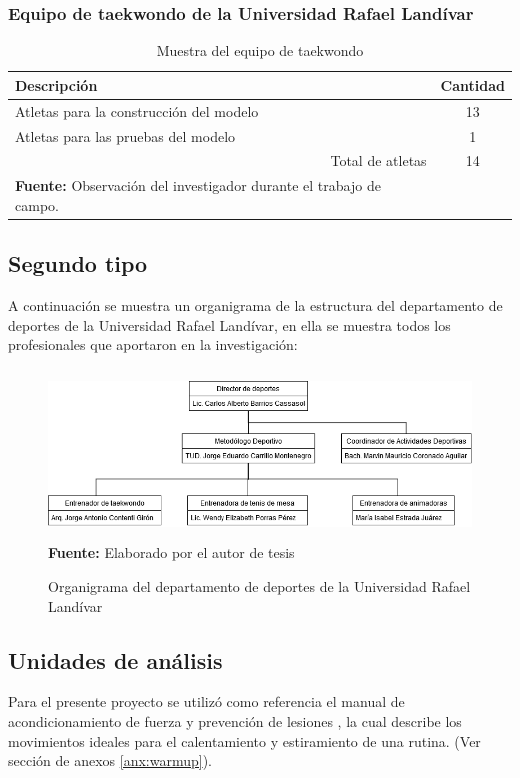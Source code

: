 \subsubsection{Equipo de taekwondo de la Universidad Rafael Land\'ivar}\label{sj:1t:tae}
\begin{table}[H]
\begin{center}
\caption{Muestra del equipo de taekwondo}
\label{tab:MuestraTaekwondo}
\begin{tabular}{lc}
\hline
\multicolumn{1}{|l|}{\textbf{Descripci\'on}} & \multicolumn{1}{l|}{\textbf{Cantidad}} \\ \hline
\multicolumn{1}{|l|}{Atletas para la construcci\'on del modelo} & \multicolumn{1}{c|}{13} \\ \hline
\multicolumn{1}{|l|}{Atletas para las pruebas del modelo} & \multicolumn{1}{c|}{1} \\ \hline
\multicolumn{1}{|r|}{Total de atletas} & \multicolumn{1}{c|}{14} \\ \hline
\textbf{Fuente:} Observaci\'on del investigador durante el trabajo de campo.
\end{tabular}
\end{center}
\end{table}
\subsection{Segundo tipo} \label{sj:2t}
A continuaci\'on se muestra un organigrama de la estructura del departamento de deportes de la Universidad Rafael Land\'ivar, en ella se muestra todos los profesionales que aportaron en la investigaci\'on:
\begin{figure}[H]
	\caption{Organigrama del departamento de deportes de la Universidad Rafael Land\'ivar}
	\label{fig:orgDeportes}
	\centering
	\includegraphics[width=450px,height=170px]{graphics/orgDeportes.png} \\
	\textbf{Fuente:} Elaborado por el autor de tesis
\end{figure}
\subsection{Unidades de an\'alisis} \label{sj:ua}
Para el presente proyecto se utiliz\'o como referencia el manual de acondicionamiento de fuerza y prevenci\'on de lesiones  \cite{arbour2006strength}, la cual describe los movimientos ideales para el calentamiento  y estiramiento de una rutina. (Ver secci\'on de anexos \ref{anx:warmup}).
